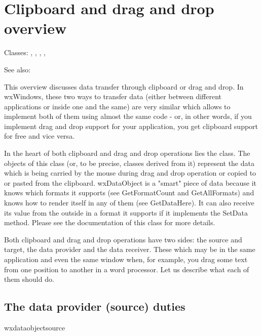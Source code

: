 
\section{Clipboard and drag and drop overview}\label{wxclipboardonfigoverview}

Classes: ,
 ,
 ,
 ,

See also: 

This overview discusses data transfer through clipboard or drag and drop. In
wxWindows, these two ways to transfer data (either between different
applications or inside one and the same) are very similar which allows to
implement both of them using almost the same code - or, in other
words, if you implement drag and drop support for your application, you get
clipboard support for free and vice versa.

In the heart of both clipboard and drag and drop operations lies the 
 class. The objects of this class (or, to
be precise, classes derived from it) represent the data which is being carried
by the mouse during drag and drop operation or copied to or pasted from the
clipboard. wxDataObject is a "smart" piece of data because it knows which
formats it supports (see GetFormatCount and GetAllFormats) and knows how to
render itself in any of them (see GetDataHere). It can also receive its value
from the outside in a format it supports if it implements the SetData method.
Please see the documentation of this class for more details.

Both clipboard and drag and drop operations have two sides: the source and
target, the data provider and the data receiver. These which may be in the same
application and even the same window when, for example, you drag some text from
one position to another in a word processor. Let us describe what each of them
should do.

\subsection{The data provider (source) duties}{wxdataobjectsource}

